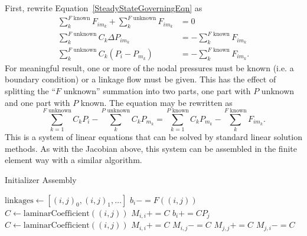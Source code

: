 \documentclass[10pt]{report}
\newcommand{\pluseq}{\ensuremath{\mathrel{+}=}}
\newcommand{\minuseq}{\ensuremath{\mathrel{-}=}}
\begin{document}
First, rewrite Equation~\ref{SteadyStateGoverningEqn} as
\begin{align}
\sum_{k}^\text{$F$ known} F_{im_k} + \sum_{k}^\text{$F$ unknown} F_{im_k}&= 0 \\
\sum_{k}^\text{$F$ unknown} C_k\Delta P_{im_k} &= -\sum_{k}^\text{$F$ known} 
F_{im_k}\\
\sum_{k}^\text{$F$ unknown} C_{k} \left(P_i-P_{m_k}\right) 
  &= -\sum_{k}^\text{$F$ known} F_{im_k}.
\end{align}
For meaningful result, one or more of the nodal pressures must be known
(i.e. a boundary condition) or a linkage flow must be given. This has the 
effect of splitting the ``$F$ unknown'' summation into two parts, one part with 
$P$ unknown and one part with $P$ known. The equation
may be rewritten as
\begin{equation}
\sum_{k=1}^\text{$F$ unknown}C_{k}P_i - \sum_{k}^\text{$P$ unknown}
C_k P_{m_k} = \sum_{k=1}^\text{$P$ known}C_k P_{m_k}
-\sum_{k}^\text{$F$ known} F_{im_k}.
\end{equation}
This is a system of linear equations that can be solved by standard linear
solution methods. As with the Jacobian above, this system can be assembled in 
the finite element way with a similar algorithm.

\begin{algorithm}
	\caption{Initializer Assembly}\label{InitializerAssembly}
	\begin{algorithmic}[1]
		\State $\text{linkages} \gets \left[ (i,j)_0, (i,j)_1, \ldots \right]$
				\State $b_i \minuseq F\left((i,j)\right)$
				\State $C \gets \text{laminarCoefficient}\left((i,j)\right)$
				\State $M_{i,i} \pluseq C$
				\State $b_i \pluseq C P_j$
			\Else{}
				\State $C \gets \text{laminarCoefficient}\left((i,j)\right)$
				\State $M_{i,i} \pluseq C$
				\State $M_{i,j} \minuseq C$
				\State $M_{j,j} \pluseq C$
				\State $M_{j,i} \minuseq C$ 
			\EndIf
		\EndFor
	\end{algorithmic}
\end{algorithm}
\end{document}
